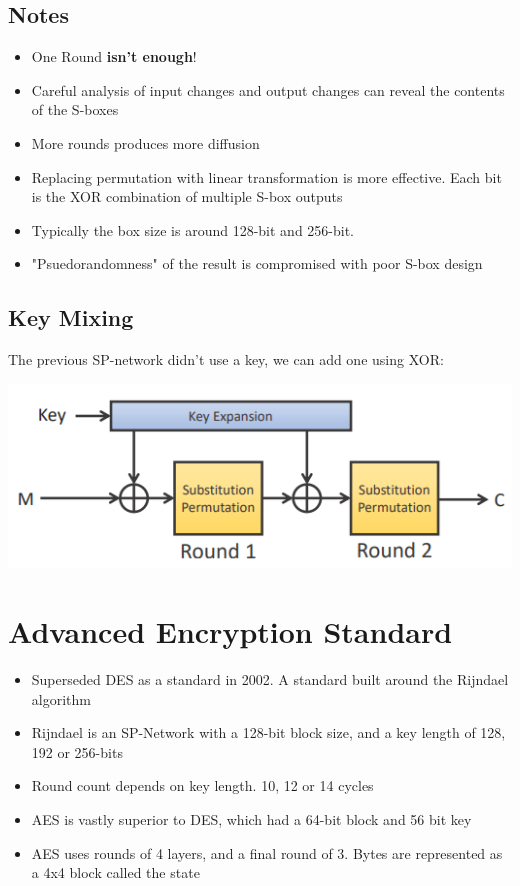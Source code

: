 \documentclass{article}
\begin{document}
\subsection{Notes}
\begin{itemize}
  \item One Round \textbf{isn’t enough}! 
  \item Careful analysis of input changes and output changes can reveal the contents of the S-boxes 
  \item More rounds produces more diffusion 
  \item Replacing permutation with linear transformation is more effective. Each bit is the XOR combination of multiple S-box outputs
  \item Typically the box size is around 128-bit and 256-bit.
  \item "Psuedorandomness" of the result is compromised with poor S-box design
\end{itemize}

\subsection{Key Mixing}
\begin{flushleft}
The previous SP-network didn’t use a key, we can add one using XOR:
\end{flushleft}
\begin{center}
  \includegraphics[scale=0.5]{key_mix.png}
\end{center}


\section{Advanced Encryption Standard}
\begin{itemize}
  \item Superseded DES as a standard in 2002. A standard built around the Rijndael algorithm 
  \item Rijndael is an SP-Network with a 128-bit block size, and a key length of 128, 192 or 256-bits 
  \item Round count depends on key length. 10, 12 or 14 cycles
  \item AES is vastly superior to DES, which had a 64-bit block and 56 bit key
  \item AES uses rounds of 4 layers, and a final round of 3. Bytes are represented as a 4x4 block called the state
\end{itemize}
\end{document}
